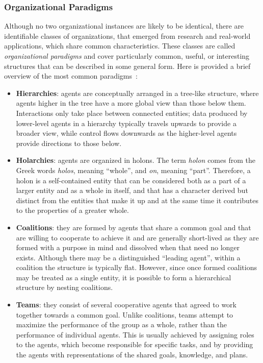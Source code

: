 \subsubsection{Organizational Paradigms}
Although no two organizational instances are likely to be identical, there are identifiable classes of organizations, that emerged from research and real-world applications, which share common characteristics.
These classes are called \textit{organizational paradigms} and cover particularly common, useful, or interesting structures that can be described in some general form.
Here is provided a brief overview of the most common paradigms~\cite{horling_lesser_2004}:
\begin{itemize}
    \item \textbf{Hierarchies}: agents are conceptually arranged in a tree-like structure, where agents higher in the tree have a more global view than those below them.
    Interactions only take place between connected entities; data produced by lower-level agents in a hierarchy typically travels upwards to provide a broader view, while control flows downwards as the higher-level agents provide directions to those below.
    \item \textbf{Holarchies}: agents are organized in holons.
    The term \textit{holon} comes from the Greek words \textit{holos}, meaning ``whole'', and \textit{on}, meaning ``part''. Therefore, a holon is a self-contained entity that can be considered both as a part of a larger entity and as a whole in itself, and that has a character derived but distinct from the entities that make it up and at the same time it contributes to the properties of a greater whole.
    \item \textbf{Coalitions}: they are formed by agents that share a common goal and that are willing to cooperate to achieve it and are generally short-lived as they are formed with a purpose in mind and dissolved when that need no longer exists.
    Although there may be a distinguished ``leading agent'', within a coalition the structure is typically flat.
    However, since once formed coalitions may be treated as a single entity, it is possible to form a hierarchical structure by nesting coalitions.
    \item \textbf{Teams}: they consist of several cooperative agents that agreed to work together towards a common goal.
    Unlike coalitions, teams attempt to maximize the performance of the group as a whole, rather than the performance of individual agents.
    This is usually achieved by assigning roles to the agents, which become responsible for specific tasks, and by providing the agents with representations of the shared goals, knowledge, and plans.

\end{itemize}
